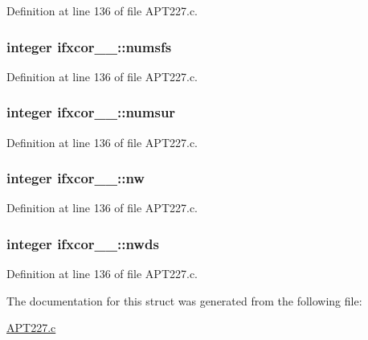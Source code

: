 Definition at line 136 of file A\+P\+T227.\+c.

\subsubsection[{\texorpdfstring{numsfs}{numsfs}}]{\setlength{\rightskip}{0pt plus 5cm}integer ifxcor\+\_\+\_\+\+::numsfs}\hypertarget{structifxcor__1___a5b338114f5b85e207bd1bb9ab1728ab3}{}\label{structifxcor__1___a5b338114f5b85e207bd1bb9ab1728ab3}


Definition at line 136 of file A\+P\+T227.\+c.

\subsubsection[{\texorpdfstring{numsur}{numsur}}]{\setlength{\rightskip}{0pt plus 5cm}integer ifxcor\+\_\+\_\+\+::numsur}\hypertarget{structifxcor__1___a4b930e3e0e24328d2fdb9a814ddd9736}{}\label{structifxcor__1___a4b930e3e0e24328d2fdb9a814ddd9736}


Definition at line 136 of file A\+P\+T227.\+c.

\subsubsection[{\texorpdfstring{nw}{nw}}]{\setlength{\rightskip}{0pt plus 5cm}integer ifxcor\+\_\+\_\+\+::nw}\hypertarget{structifxcor__1___a676455bd535b7b905729642ce2287841}{}\label{structifxcor__1___a676455bd535b7b905729642ce2287841}


Definition at line 136 of file A\+P\+T227.\+c.

\subsubsection[{\texorpdfstring{nwds}{nwds}}]{\setlength{\rightskip}{0pt plus 5cm}integer ifxcor\+\_\+\_\+\+::nwds}\hypertarget{structifxcor__1___aab2c6e13c35ae14d13b05033ea131920}{}\label{structifxcor__1___aab2c6e13c35ae14d13b05033ea131920}


Definition at line 136 of file A\+P\+T227.\+c.



The documentation for this struct was generated from the following file\+:\begin{DoxyCompactItemize}
\item 
\hyperlink{APT227_8c}{A\+P\+T227.\+c}\end{DoxyCompactItemize}
